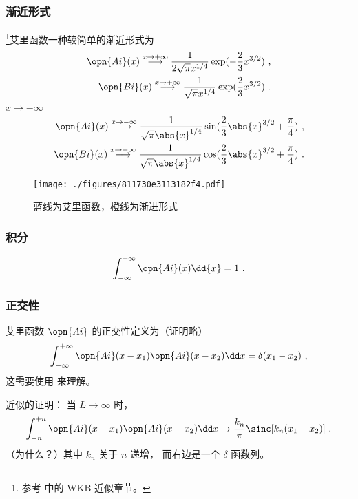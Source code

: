 \subsubsection{渐近形式}
\footnote{参考 \cite{GriffQ} 中的 WKB 近似章节。}艾里函数一种较简单的渐近形式为
\begin{align}\label{eq_AiryF_3}
\opn{Ai}(x) \overset{x \to +\infty}{\longrightarrow} \frac{1}{2\sqrt{\pi} x^{1/4}} \exp(-\frac{2}{3}x^{3/2})~,\\
\opn{Bi}(x) \overset{x \to +\infty}{\longrightarrow} \frac{1}{\sqrt{\pi} x^{1/4}} \exp(\frac{2}{3}x^{3/2})~.
\end{align}
$x \to -\infty$
\begin{align}
\opn{Ai}(x) \overset{x \to -\infty}{\longrightarrow} \frac{1}{\sqrt{\pi} \abs{x}^{1/4}} \sin(\frac{2}{3}\abs{x}^{3/2}+\frac{\pi}{4})~,\\
\opn{Bi}(x) \overset{x \to -\infty}{\longrightarrow} \frac{1}{\sqrt{\pi} \abs{x}^{1/4}} \cos(\frac{2}{3}\abs{x}^{3/2}+\frac{\pi}{4})~.
\end{align}
\begin{figure}[ht]
\centering
\texttt{[image: ./figures/811730e3113182f4.pdf]}
\caption{蓝线为艾里函数，橙线为渐进形式} \label{fig_AiryF_2}
\end{figure}

\subsubsection{积分}
\begin{equation}
\int_{-\infty}^{+\infty} \opn{Ai}(x) \dd{x} = 1~.
\end{equation}


\subsubsection{正交性}
艾里函数 $\opn{Ai}$ 的正交性定义为（证明略）
\begin{equation}
\int_{-\infty}^{+\infty} \opn{Ai}(x-x_1)\opn{Ai}(x-x_2)\dd x=\delta(x_1-x_2)~,
\end{equation}
这需要使用 来理解。

近似的证明： 当 $L\to \infty$ 时，
\begin{equation}
\int_{-n}^{+n} \opn{Ai}(x-x_1)\opn{Ai}(x-x_2)\dd x \to \frac{k_n}{\pi}\sinc[k_n (x_1 - x_2)]~.
\end{equation}
（为什么？）其中 $k_n$ 关于 $n$ 递增， 而右边是一个 $\delta$ 函数列。%

